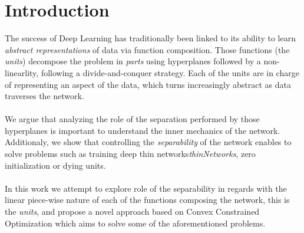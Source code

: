 \section{Introduction}


The success of Deep Learning has traditionally been linked to its ability to learn \emph{abstract representations} of data via function composition\cite{LeCun06atutorial}. Those functions (the \emph{units}) decompose the problem in \emph{parts} using hyperplanes followed by a non-linearlity, following a divide-and-conquer strategy. Each of the units are in charge of representing an aspect of the data, which turns increasingly abstract as data traverses the network. 
\\\\
We argue that analyzing the role of the separation performed by those hyperplanes is important to understand the inner mechanics of the network. Additionaly, we show that controlling the \emph{separability} of the network enables to solve problems such as training deep thin networks\emph{thinNetworks}, zero initialization \cite{FixUP} or dying units\cite{LeakyReLU}.
\\\\ 



In this work we attempt to explore role of the separability in regards with the linear piece-wise nature of each of the functions composing the network, this is the \emph{units}, and propose a novel approach based on Convex Constrained Optimization which aims to solve some of the aforementioned problems.

